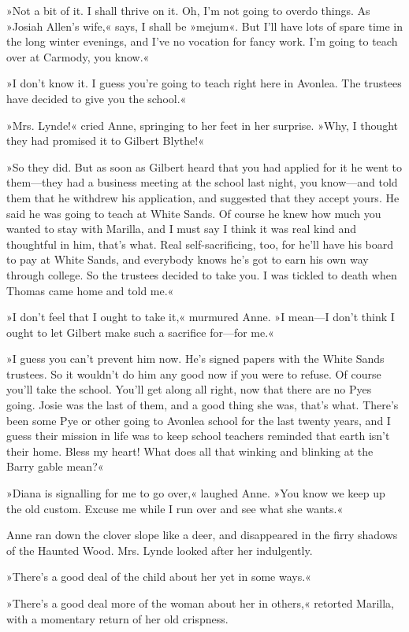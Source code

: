 »Not a bit of it. I shall thrive on it. Oh, I’m not going to overdo things. As »Josiah Allen's wife,« says, I shall be »mejum«. But I’ll have lots of spare time in the long winter evenings, and I’ve no vocation for fancy work. I’m going to teach over at Carmody, you know.«

»I don’t know it. I guess you’re going to teach right here in Avonlea. The trustees have decided to give you the school.«

»Mrs. Lynde!« cried Anne, springing to her feet in her surprise. »Why, I thought they had promised it to Gilbert Blythe!«

»So they did. But as soon as Gilbert heard that you had applied for it he went to them—they had a business meeting at the school last night, you know—and told them that he withdrew his application, and suggested that they accept yours. He said he was going to teach at White Sands. Of course he knew how much you wanted to stay with Marilla, and I must say I think it was real kind and thoughtful in him, that’s what. Real self-sacrificing, too, for he’ll have his board to pay at White Sands, and everybody knows he’s got to earn his own way through college. So the trustees decided to take you. I was tickled to death when Thomas came home and told me.«

»I don’t feel that I ought to take it,« murmured Anne. »I mean—I don’t think I ought to let Gilbert make such a sacrifice for—for me.«

»I guess you can’t prevent him now. He’s signed papers with the White Sands trustees. So it wouldn’t do him any good now if you were to refuse. Of course you’ll take the school. You’ll get along all right, now that there are no Pyes going. Josie was the last of them, and a good thing she was, that’s what. There’s been some Pye or other going to Avonlea school for the last twenty years, and I guess their mission in life was to keep school teachers reminded that earth isn’t their home. Bless my heart! What does all that winking and blinking at the Barry gable mean?«

»Diana is signalling for me to go over,« laughed Anne. »You know we keep up the old custom. Excuse me while I run over and see what she wants.«

Anne ran down the clover slope like a deer, and disappeared in the firry shadows of the Haunted Wood. Mrs. Lynde looked after her indulgently.

»There’s a good deal of the child about her yet in some ways.«

»There’s a good deal more of the woman about her in others,« retorted Marilla, with a momentary return of her old crispness.

